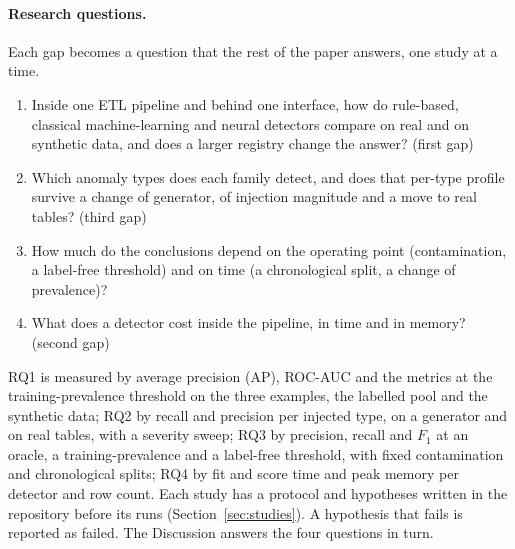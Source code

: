 \documentclass[conference]{IEEEtran}
\begin{document}
\paragraph{Research questions.}\label{sec:rq} Each gap becomes a question that the
rest of the paper answers, one study at a time.
\begin{enumerate}
    \item[\textbf{RQ1}] Inside one ETL pipeline and behind one interface, how do rule-based,
    classical machine-learning and neural detectors compare on real and on
    synthetic data, and does a larger registry change the answer? (first gap)
    \item[\textbf{RQ2}] Which anomaly types does each family detect, and does that
    per-type profile survive a change of generator, of injection magnitude and a move
    to real tables? (third gap)
    \item[\textbf{RQ3}] How much do the conclusions depend on the operating point
    (contamination, a label-free threshold) and on time (a chronological split, a
    change of prevalence)?
    \item[\textbf{RQ4}] What does a detector cost inside the pipeline, in time and
    in memory? (second gap)
\end{enumerate}
RQ1 is measured by average precision (AP), ROC-AUC and the metrics at the training-prevalence
threshold on the three examples, the labelled pool and the synthetic data; RQ2 by recall and precision
per injected type, on a generator and on real tables, with a severity sweep; RQ3 by precision, recall and
$F_1$ at an oracle, a training-prevalence and a label-free threshold, with fixed contamination and
chronological splits; RQ4 by fit and score time and peak memory per detector and row count.
Each study has a protocol and hypotheses written in the repository before its
runs (Section~\ref{sec:studies}). A hypothesis that fails is reported as failed.
The Discussion answers the four questions in turn.
\end{document}
